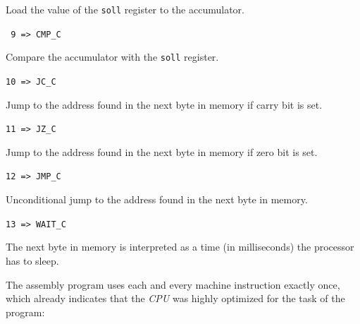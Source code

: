 \documentclass[a4paper,10pt]{scrartcl}
\begin{document}
Load the value of the \texttt{soll} register to the accumulator.

\noindent\texttt{ 9  =>  CMP\_C}

Compare the accumulator with the \texttt{soll} register.

\noindent\texttt{10  =>  JC\_C}

Jump to the address found in the next byte in memory if carry bit is set.

\noindent\texttt{11  =>  JZ\_C}

Jump to the address found in the next byte in memory if zero bit is set.

\noindent\texttt{12  =>  JMP\_C}

Unconditional jump to the address found in the next byte in memory.

\noindent\texttt{13  =>  WAIT\_C}

The next byte in memory is interpreted as a time (in milliseconds) the processor has to sleep.



\label{sec:ass_prog}


The assembly program uses each and every machine instruction exactly once, which already indicates that the \emph{CPU} was highly optimized for the task of the program:
\linebreak[5]
\end{document}
